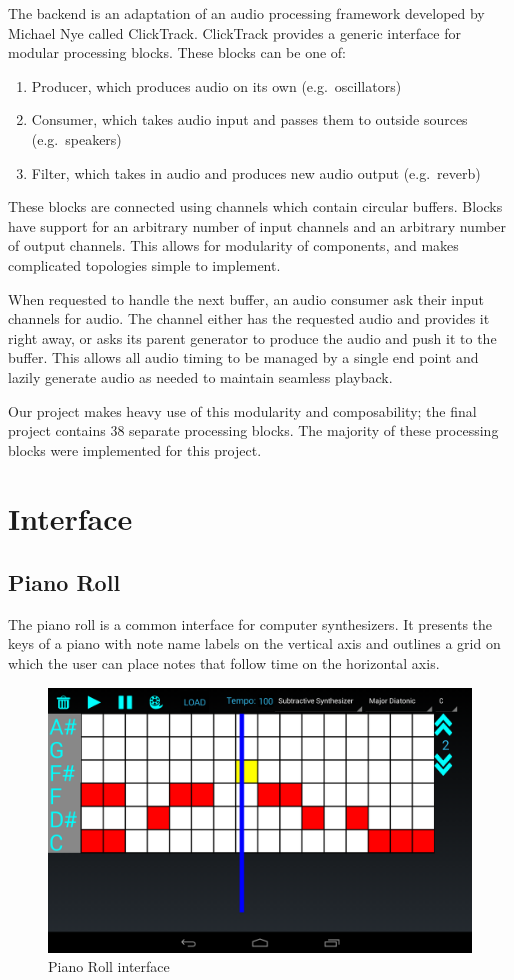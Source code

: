 \documentclass[letterpaper,12pt]{article}
\begin{document}
The backend is an adaptation of an audio processing framework developed by Michael Nye called ClickTrack\cite{clicktrack}. ClickTrack provides a generic interface for modular processing blocks. These blocks can be one of:
\begin{enumerate}
    \item Producer, which produces audio on its own (e.g.\ oscillators)
    \item Consumer, which takes audio input and passes them to outside sources (e.g.\ speakers)
    \item Filter, which takes in audio and produces new audio output (e.g.\ reverb)
\end{enumerate}
These blocks are connected using channels which contain circular buffers. Blocks have support for an arbitrary number of input channels and an arbitrary number of output channels. This allows for modularity of components, and makes complicated topologies simple to implement.

When requested to handle the next buffer, an audio consumer ask their input channels for audio. The channel either has the requested audio and provides it right away, or asks its parent generator to produce the audio and push it to the buffer. This allows all audio timing to be managed by a single end point and lazily generate audio as needed to maintain seamless playback.

Our project makes heavy use of this modularity and composability; the final project contains 38 separate processing blocks. The majority of these processing blocks were implemented for this project.

\section{Interface}
\label{sec:interface}

\subsection{Piano Roll}
The piano roll is a common interface for computer synthesizers. It  presents the keys of a piano with note name labels on the vertical axis and outlines a grid on which the user can place notes that follow time on the horizontal axis. 

\begin{figure}[h]
\centering
\includegraphics[width=.8\textwidth]{figures/pianoroll.png}
\caption{Piano Roll interface}
\label{fig:pianoroll}
\end{figure}
\end{document}

